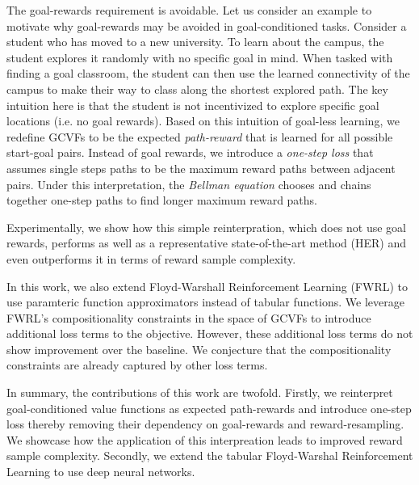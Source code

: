 The goal-rewards requirement is avoidable. Let us consider an example to
motivate why goal-rewards may be avoided in goal-conditioned tasks. Consider a
student who has moved to a new university. To learn about the campus,
the student explores it randomly with no specific goal in mind. When
tasked with finding a goal classroom, the student can then use the
learned connectivity of the campus to make their way to class along the
shortest explored path. The key intuition here is that the
student is not incentivized to explore specific goal locations (i.e. no
goal rewards). 
%
Based on this intuition of goal-less learning, we redefine GCVFs to be
the expected \emph{path-reward} that is learned for all possible
start-goal pairs. Instead of goal rewards, we  
introduce a \emph{one-step loss} that assumes single steps paths 
to be the maximum reward paths between adjacent pairs.
Under this interpretation, the \emph{Bellman equation} chooses and chains
together one-step paths to find longer maximum reward paths. 

%
Experimentally, we show how this simple reinterpration, which does not use goal
rewards, performs as well as a representative state-of-the-art method (HER) and
even outperforms it in terms of reward sample complexity.

In this work, we also extend Floyd-Warshall Reinforcement
Learning (FWRL) \citep{dhiman2018floydwarshall} to use paramteric
function approximators instead of tabular functions.  We leverage FWRL's
compositionality constraints in the space of GCVFs to introduce
additional loss terms to the objective. However, these additional loss
terms do not show improvement over the baseline. We conjecture that the
compositionality constraints are already captured by other loss terms. 

In summary, the  contributions of this work are twofold. Firstly, we
reinterpret goal-conditioned value functions as expected path-rewards
and introduce one-step loss thereby removing their dependency on
goal-rewards and reward-resampling. We showcase how the
application of this interpreation leads to improved reward sample complexity.
Secondly, we extend the tabular Floyd-Warshal Reinforcement Learning to
use deep neural networks.


